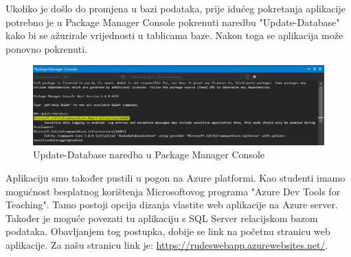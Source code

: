 			 \textnormal{Ukoliko je došlo do promjena u bazi podataka, prije idućeg pokretanja aplikacije potrebno je u Package Manager Console pokrenuti naredbu "Update-Database" kako bi se ažurirale vrijednosti u tablicama baze. Nakon toga se aplikacija može ponovno pokrenuti.}
			 
			 \begin{figure}[H]
			 	\includegraphics[width=\linewidth]{deployment/pmc_update_database.png}
			 	\centering
			 	\caption{Update-Database naredba u Package Manager Console}
			 	\label{fig:ClassDiagram1}
			 \end{figure}	
		 
		 	\textnormal{Aplikaciju smo također pustili u pogon na Azure platformi. Kao studenti imamo mogućnost besplatnog korištenja Microsoftovog programa "Azure Dev Tools for Teaching". Tamo postoji opcija dizanja vlastite web aplikacije na Azure server. Također je moguće povezati tu aplikaciju s SQL Server relacijskom bazom podataka. Obavljanjem tog postupka, dobije se link na početnu stranicu web aplikacije. Za našu stranicu link je: \href{https://rudeswebapp.azurewebsites.net/}{https://rudeswebapp.azurewebsites.net/}}.
			
			\eject 